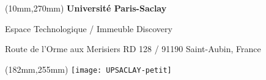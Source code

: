 \begin{textblock*}{161mm}(10mm,270mm)
\color{bordeau}
{\bf\noindent Université Paris-Saclay	         }

\noindent Espace Technologique / Immeuble Discovery 

\noindent Route de l’Orme aux Merisiers RD 128 / 91190 Saint-Aubin, France 
\end{textblock*}

\begin{textblock*}{20mm}(182mm,255mm)
\texttt{[image: UPSACLAY-petit]}
\end{textblock*}

%